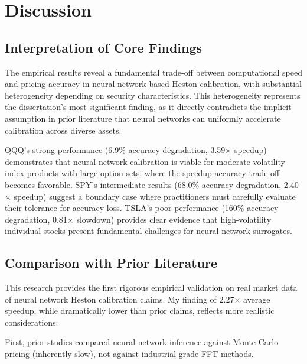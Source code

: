 \documentclass[12pt,a4paper]{article}
\begin{document}



\newpage

\section{Discussion}

\label{sec:discussion}

\subsection{Interpretation of Core Findings}

The empirical results reveal a fundamental trade-off between computational speed and pricing accuracy in neural network-based Heston calibration, with substantial heterogeneity depending on security characteristics. This heterogeneity represents the dissertation's most significant finding, as it directly contradicts the implicit assumption in prior literature that neural networks can uniformly accelerate calibration across diverse assets.

QQQ's strong performance (6.9\% accuracy degradation, 3.59$\times$ speedup) demonstrates that neural network calibration is viable for moderate-volatility index products with large option sets, where the speedup-accuracy trade-off becomes favorable. SPY's intermediate results (68.0\% accuracy degradation, 2.40$\times$ speedup) suggest a boundary case where practitioners must carefully evaluate their tolerance for accuracy loss. TSLA's poor performance (160\% accuracy degradation, 0.81$\times$ slowdown) provides clear evidence that high-volatility individual stocks present fundamental challenges for neural network surrogates.

\subsection{Comparison with Prior Literature}

This research provides the first rigorous empirical validation on real market data of neural network Heston calibration claims. My finding of 2.27$\times$ average speedup, while dramatically lower than prior claims, reflects more realistic considerations:

First, prior studies compared neural network inference against Monte Carlo pricing (inherently slow), not against industrial-grade FFT methods.
\end{document}
